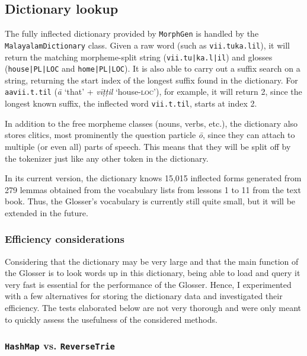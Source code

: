 \documentclass[a4paper]{article}
\newcommand{\typ}[1]{\texttt{#1}}
\newcommand{\afx}[1]{\textsc{#1}}
\begin{document}
\subsection{Dictionary lookup}

The fully inflected dictionary provided by \typ{MorphGen} is handled by the \typ{MalayalamDictionary} class. Given a raw word (such as \typ{vii.tuka.lil}), it will return the matching morpheme-split string (\typ{vii.tu|ka.l|il}) and glosses (\typ{house|PL|LOC} and \typ{home|PL|LOC}). It is also able to carry out a suffix search on a string, returning the start index of the longest suffix found in the dictionary. For \typ{aavii.t.til} (\textit{ā} `that' + \textit{vīṭṭil} `house-\afx{loc}'), for example, it will return 2, since the longest known suffix, the inflected word \typ{vii.t.til}, starts at index 2.

In addition to the free morpheme classes (nouns, verbs, etc.), the dictionary also stores clitics, most prominently the question particle \textit{ō}, since they can attach to multiple (or even all) parts of speech. This means that they will be split off by the tokenizer just like any other token in the dictionary.

In its current version, the dictionary knows 15,015 inflected forms generated from 279 lemmas obtained from the vocabulary lists from lessons 1 to 11 from the \textcite{moag} text book. Thus, the Glosser's vocabulary is currently still quite small, but it will be extended in the future.

\subsubsection{Efficiency considerations}

Considering that the dictionary may be very large and that the main function of the Glosser is to look words up in this dictionary, being able to load and query it very fast is essential for the performance of the Glosser. Hence, I experimented with a few alternatives for storing the dictionary data and investigated their efficiency. The tests elaborated below are not very thorough and were only meant to quickly assess the usefulness of the considered methods.

\subsubsection*{\typ{HashMap} vs. \typ{ReverseTrie}}
\end{document}
